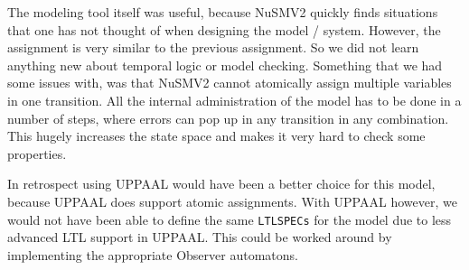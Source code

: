 \documentclass[a4paper,10pt]{article}
\begin{document}
	The modeling tool itself was useful, because NuSMV2 quickly finds situations that one has not thought of when designing the model / system.
	However, the assignment is very similar to the previous assignment.
	So we did not learn anything new about temporal logic or model checking.
	Something that we had some issues with, was that NuSMV2 cannot atomically assign multiple variables in one transition.
	All the internal administration of the model has to be done in a number of steps, where errors can pop up in any transition in any combination.
	This hugely increases the state space and makes it very hard to check some properties.
	
	In retrospect using UPPAAL would have been a better choice for this model, because UPPAAL does support atomic assignments.
	With UPPAAL however, we would not have been able to define the same \texttt{LTLSPECs} for the model due to less advanced LTL support in UPPAAL.
	This could be worked around by implementing the appropriate Observer automatons.
\end{document}
